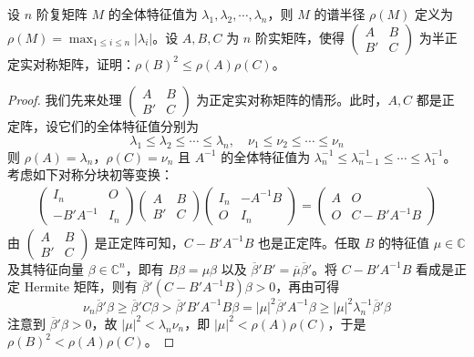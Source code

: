 \documentclass[../../main.tex]{subfiles}
\begin{document}
\begin{proposition}\label{proposition:例9.57}
设 \(n\) 阶复矩阵 \(M\) 的全体特征值为 \(\lambda_1,\lambda_2,\cdots,\lambda_n\)，则 \(M\) 的谱半径 \(\rho(M)\) 定义为 \(\rho(M)=\max_{1\leqslant  i \leqslant  n}|\lambda_i|\)。设 \(A,B,C\) 为 \(n\) 阶实矩阵，使得 \(\begin{pmatrix}
A & B \\
B' & C
\end{pmatrix}\) 为半正定实对称矩阵，证明：\(\rho(B)^2 \leqslant  \rho(A)\rho(C)\)。
\end{proposition}
\begin{proof}
我们先来处理 \(\begin{pmatrix}
A & B \\
B' & C
\end{pmatrix}\) 为正定实对称矩阵的情形。此时，\(A,C\) 都是正定阵，设它们的全体特征值分别为
\[
\lambda_1 \leqslant  \lambda_2 \leqslant  \cdots \leqslant  \lambda_n,\quad \nu_1 \leqslant  \nu_2 \leqslant  \cdots \leqslant  \nu_n
\]
则 \(\rho(A) = \lambda_n\)，\(\rho(C) = \nu_n\) 且 \(A^{-1}\) 的全体特征值为 \(\lambda_n^{-1} \leqslant  \lambda_{n - 1}^{-1} \leqslant  \cdots \leqslant  \lambda_1^{-1}\)。考虑如下对称分块初等变换：
\begin{align*}
\begin{pmatrix}
I_n & O \\
-B'A^{-1} & I_n
\end{pmatrix}
\begin{pmatrix}
A & B \\
B' & C
\end{pmatrix}
\begin{pmatrix}
I_n & -A^{-1}B \\
O & I_n
\end{pmatrix}
=
\begin{pmatrix}
A & O \\
O & C - B'A^{-1}B
\end{pmatrix}
\end{align*}
由 \(\begin{pmatrix}
A & B \\
B' & C
\end{pmatrix}\) 是正定阵可知，\(C - B'A^{-1}B\) 也是正定阵。任取 \(B\) 的特征值 \(\mu \in \mathbb{C}\) 及其特征向量 \(\beta \in \mathbb{C}^n\)，即有 \(B\beta = \mu\beta\) 以及 \(\overline{\beta}'B' = \overline{\mu}\overline{\beta}'\)。将 \(C - B'A^{-1}B\) 看成是正定 Hermite 矩阵，则有 \(\overline{\beta}'(C - B'A^{-1}B)\beta > 0\)，再由可得
\[
\nu_n\overline{\beta}'\beta \geqslant  \overline{\beta}'C\beta > \overline{\beta}'B'A^{-1}B\beta = |\mu|^2\overline{\beta}'A^{-1}\beta \geqslant  |\mu|^2\lambda_n^{-1}\overline{\beta}'\beta
\]
注意到 \(\overline{\beta}'\beta > 0\)，故 \(|\mu|^2 < \lambda_n\nu_n\)，即 \(|\mu|^2 < \rho(A)\rho(C)\)，于是 \(\rho(B)^2 < \rho(A)\rho(C)\)。


\end{proof}
\end{document}
